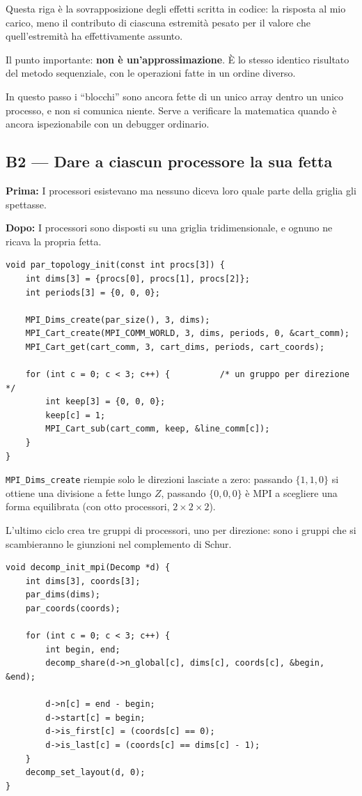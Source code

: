 \documentclass[11pt,a4paper]{article}
\newcommand{\prima}[1]{\par\smallskip\noindent\textbf{\color{scuro}Prima:} #1\par}
\newcommand{\dopo}[1]{\par\smallskip\noindent\textbf{\color{scuro}Dopo:} #1\par\smallskip}
\newcommand{\cd}[1]{\texttt{\small #1}}
\begin{document}
Questa riga è la sovrapposizione degli effetti scritta in codice: la risposta al
mio carico, meno il contributo di ciascuna estremità pesato per il valore che
quell'estremità ha effettivamente assunto.

Il punto importante: \textbf{non è un'approssimazione}. È lo stesso identico
risultato del metodo sequenziale, con le operazioni fatte in un ordine diverso.

In questo passo i ``blocchi'' sono ancora fette di un unico array dentro un
unico processo, e non si comunica niente. Serve a verificare la matematica
quando è ancora ispezionabile con un debugger ordinario.

\subsection*{B2 --- Dare a ciascun processore la sua fetta}

\prima{I processori esistevano ma nessuno diceva loro quale parte della griglia
gli spettasse.}
\dopo{I processori sono disposti su una griglia tridimensionale, e ognuno ne
ricava la propria fetta.}

\begin{lstlisting}
void par_topology_init(const int procs[3]) {
    int dims[3] = {procs[0], procs[1], procs[2]};
    int periods[3] = {0, 0, 0};

    MPI_Dims_create(par_size(), 3, dims);
    MPI_Cart_create(MPI_COMM_WORLD, 3, dims, periods, 0, &cart_comm);
    MPI_Cart_get(cart_comm, 3, cart_dims, periods, cart_coords);

    for (int c = 0; c < 3; c++) {          /* un gruppo per direzione */
        int keep[3] = {0, 0, 0};
        keep[c] = 1;
        MPI_Cart_sub(cart_comm, keep, &line_comm[c]);
    }
}
\end{lstlisting}

\cd{MPI\_Dims\_create} riempie solo le direzioni lasciate a zero: passando
$\{1,1,0\}$ si ottiene una divisione a fette lungo $Z$, passando $\{0,0,0\}$ è
MPI a scegliere una forma equilibrata (con otto processori, $2\times2\times2$).

L'ultimo ciclo crea tre gruppi di processori, uno per direzione: sono i gruppi
che si scambieranno le giunzioni nel complemento di Schur.

\begin{lstlisting}
void decomp_init_mpi(Decomp *d) {
    int dims[3], coords[3];
    par_dims(dims);
    par_coords(coords);

    for (int c = 0; c < 3; c++) {
        int begin, end;
        decomp_share(d->n_global[c], dims[c], coords[c], &begin, &end);

        d->n[c] = end - begin;
        d->start[c] = begin;
        d->is_first[c] = (coords[c] == 0);
        d->is_last[c] = (coords[c] == dims[c] - 1);
    }
    decomp_set_layout(d, 0);
}
\end{lstlisting}
\end{document}

